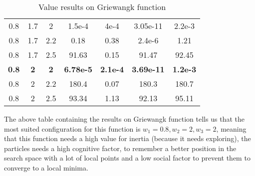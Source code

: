 \documentclass{article}
\begin{document}
\begin{table}[h!]
\begin{tabular}{ |c|c|c|c|c|c|c| }
0.8 & 1.7 & 2 & 1.5e-4 & 4e-4 & 3.05e-11 & 2.2e-3\\
0.8 & 1.7 & 2.2 & 0.18 & 0.38 & 2.4e-6 & 1.21\\
0.8 & 1.7 & 2.5 & 91.63 & 0.15 & 91.47 & 92.45\\
\textbf{0.8} & \textbf{2} & \textbf{2} & \textbf{6.78e-5} & \textbf{2.1e-4} & \textbf{3.69e-11} & \textbf{1.2e-3}\\
0.8 & 2 & 2.2 & 180.4 & 0.07 & 180.3 & 180.7\\
0.8 & 2 & 2.5 & 93.34 & 1.13 & 92.13 & 95.11\\
\hline
\end{tabular}
\caption{Value results on Griewangk function}
\label{table:1}
\end{table}

The above table containing the results on Griewangk function tells us that the most suited configuration for this function is $w_1 = 0.8, w_2 = 2, w_3 = 2$, meaning that this function needs a high value for inertia (because it needs exploring), the particles needs a high cognitive factor, to remember a better position in the search space with a lot of local points and a low social factor to prevent them to converge to a local minima.
\end{document}
